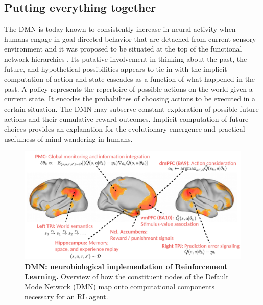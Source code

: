 \documentclass[10pt,letterpaper]{article}
\begin{document}
\subsection{Putting everything together}
The DMN is today known to consistently increase in neural
  activity when humans engage in goal-directed behavior that are detached from
  current sensory environment \citep{kenet2003spontaneously, fiser2004small}
  and it was proposed to be situated at the top of the functional network hierarchies
  \citep{carhart2010default, margulies2016situating}.
  Its putative involvement in thinking about the past,
  the future, and hypothetical possibilities
  appears to tie in with the implicit computation of
  action and state cascades as a function of what happened in the past.
  A policy represents the repertoire of possible actions
    on the world given a current state. It encodes the probabilites of
    choosing actions to be executed in a certain situation.
The DMN may subserve
  constant exploration of possible future actions and their
  cumulative reward outcomes. Implicit computation of future choices
  provides an explanation for the
  evolutionary emergence and practical usefulness of mind-wandering
  in humans.
\begin{figure}[!h]
  \includegraphics[width=.9\linewidth]{neurobiological_and_rl_overview_DMN.pdf}
  \caption{\textbf{DMN: neurobiological implementation of Reinforcement Learning.}
  Overview of how the constituent nodes of the Default Mode Network (DMN)
  map onto computational components necessary for an RL agent.}
  \label{fig:rl_process_chart}
\end{figure}
\end{document}
